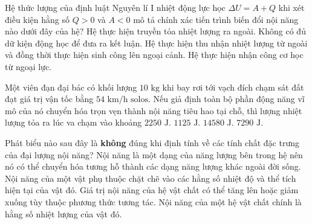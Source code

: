 \begin{ex}%
	Hệ thức lượng của định luật Nguyên lí I nhiệt động lực học $\Delta U = A + Q$ khi xét điều kiện hằng số $Q > 0$ và $A < 0$ mô tả chính xác tiến trình biến đổi nội năng nào dưới đây của hệ?
	\choice
	{Hệ thực hiện truyền tỏa nhiệt lượng ra ngoài.}
	{Không có đủ dữ kiện động học để đưa ra kết luận.}
	{\True Hệ thực hiện thu nhận nhiệt lượng từ ngoài và đồng thời thực hiện sinh công lên ngoại cảnh.}
	{Hệ thực hiện nhận công cơ học từ ngoại lực.}
\end{ex}

\begin{ex}%
	Một viên đạn đại bác có khối lượng $10\text{ kg}$ khi bay rơi tới vạch đích chạm sát đất đạt giá trị vận tốc bằng $54\text{ km/h solos}$. Nếu giả định toàn bộ phần động năng vĩ mô của nó chuyển hóa trọn vẹn thành nội năng tiêu hao tại chỗ, thì lượng nhiệt lượng tỏa ra lúc va chạm vào khoảng
	\choice
	{$2250\text{ J}$.}
	{\True $1125\text{ J}$.}
	{$14580\text{ J}$.}
	{$7290\text{ J}$.}
\end{ex}

\begin{ex}%
	Phát biểu nào sau đây là \textbf{không} đúng khi định tính về các tính chất đặc trưng của đại lượng nội năng?
	\choice
	{Nội năng là một dạng của năng lượng bên trong hệ nên nó có thể chuyển hóa tương hỗ thành các dạng năng lượng khác ngoài đời sống.}
	{Nội năng của một vật phụ thuộc chặt chẽ vào các hằng số nhiệt độ và thể tích hiện tại của vật đó.}
	{Giá trị nội năng của hệ vật chất có thể tăng lên hoặc giảm xuống tùy thuộc phương thức tương tác.}
	{\True Nội năng của một hệ vật chất chính là hằng số nhiệt lượng của vật đó.}
\end{ex}

